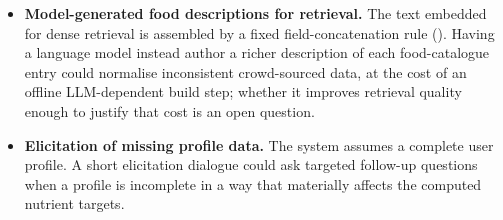 \begin{itemize}
    \item \textbf{Model-generated food descriptions for retrieval.} The text embedded for dense retrieval is assembled by a fixed field-concatenation rule (). Having a language model instead author a richer description of each food-catalogue entry could normalise inconsistent crowd-sourced data, at the cost of an offline LLM-dependent build step; whether it improves retrieval quality enough to justify that cost is an open question.
    \item \textbf{Elicitation of missing profile data.} The system assumes a complete user profile. A short elicitation dialogue could ask targeted follow-up questions when a profile is incomplete in a way that materially affects the computed nutrient targets.
\end{itemize}
